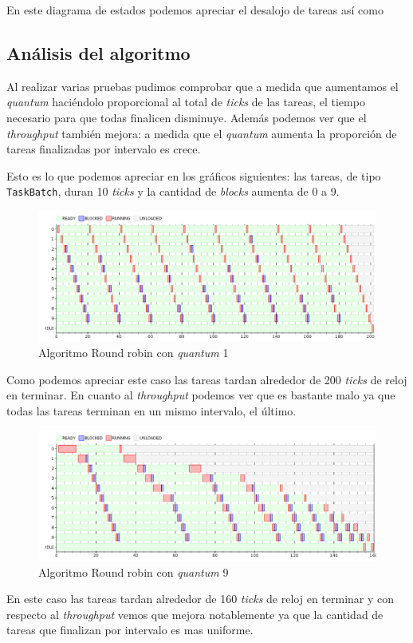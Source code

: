 En este diagrama de estados podemos apreciar el desalojo de tareas así como 

\subsection{Análisis del algoritmo}

Al realizar varias pruebas pudimos comprobar que a medida que aumentamos el \textit{quantum} haciéndolo proporcional al total de \textit{ticks} de las tareas, el tiempo necesario para que todas finalicen disminuye. Además podemos ver que el \textit{throughput} también mejora: a medida que el \textit{quantum} aumenta la proporción de tareas finalizadas por intervalo es crece.

Esto es lo que podemos apreciar en los gráficos siguientes: las tareas, de tipo \verb|TaskBatch|, duran 10 \textit{ticks} y la cantidad de \textit{blocks} aumenta de 0 a 9. 

\begin{figure}[H]
\centering
\includegraphics[scale=0.4]{./graficos/out_batch_fijo1.png}
\caption{Algoritmo Round robin con \textit{quantum} 1}
\end{figure}  

Como podemos apreciar este caso las tareas tardan alrededor de 200 \textit{ticks} de reloj en terminar. En cuanto al \textit{throughput} podemos ver que es bastante malo ya que todas las tareas terminan en un mismo intervalo, el último. 

 
\begin{figure}[H]
\centering
\includegraphics[scale=0.4]{./graficos/out_batch_fijo9.png}
\caption{Algoritmo Round robin con \textit{quantum} 9} 
\end{figure}


En este caso las tareas tardan alrededor de 160 \textit{ticks} de reloj en terminar y con respecto al \textit{throughput} vemos que mejora notablemente ya que la cantidad de tareas que finalizan por intervalo es mas uniforme. 


